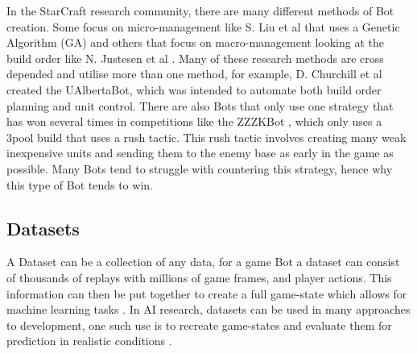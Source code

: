 \documentclass[journal]{IEEEtran}
\begin{document}
	In the StarCraft research community, there are many different methods of Bot creation. Some focus on micro-management like S. Liu et al \cite{EffectiveMicro} that uses a Genetic Algorithm (GA) and others that focus on macro-management looking at the build order like N. Justesen et al \cite{OnlineEvo}. Many of these research methods are cross depended and utilise more than one method, for example, D. Churchill et al \cite{Agents} created the UAlbertaBot, which was intended to automate both build order planning and unit control. There are also Bots that only use one strategy that has won several times in competitions like the ZZZKBot \cite{ZZZK,Results}, which only uses a 3pool build that uses a rush tactic. This rush tactic involves creating many weak inexpensive units and sending them to the enemy base as early in the game as possible. Many Bots tend to struggle with countering this strategy, hence why this type of Bot tends to win.
	
	\subsection{Datasets}
	A Dataset can be a collection of any data, for a game Bot a dataset can consist of thousands of replays with millions of game frames, and player actions\cite{Dataset}. This information can then be put together to create a full game-state which allows for machine learning tasks \cite{Dataset17}. In AI research, datasets can be used in many approaches to development, one such use is to recreate game-states and evaluate them for prediction in realistic conditions \cite{SpecialTactics}.
	
\end{document}
